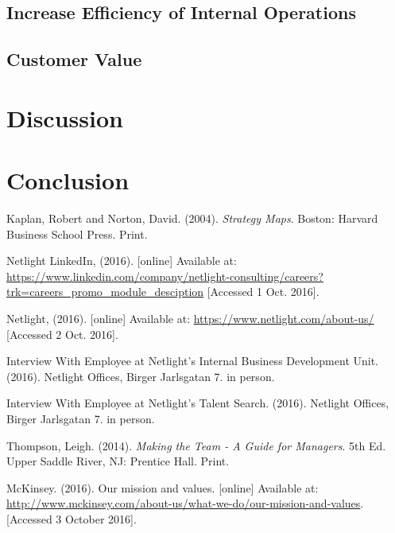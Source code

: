 \documentclass[12pt]{article}
\begin{document}
\subsection*{Increase Efficiency of Internal Operations}


\subsection*{Customer Value}
\hspace*{5pt}

\newpage
\section*{Discussion}

\section*{Conclusion}

\newpage

\makeatletter
\renewcommand\@biblabel[1]{}
\makeatother
\begin{thebibliography}{9}

 Kaplan, Robert and Norton, David. (2004). \textit{Strategy Maps}. Boston: Harvard Business School Press. Print.

 Netlight LinkedIn, (2016). [online] Available at: \url{https://www.linkedin.com/company/netlight-consulting/careers?trk=careers_promo_module_desciption} [Accessed 1 Oct. 2016].

 Netlight, (2016). [online] Available at: \url{https://www.netlight.com/about-us/} [Accessed 2 Oct. 2016].

 Interview With Employee at Netlight's Internal Business Development Unit. (2016). Netlight Offices, Birger Jarlsgatan 7. in person.

 Interview With Employee at Netlight's Talent Search. (2016). Netlight Offices, Birger Jarlsgatan 7. in person.

 Thompson, Leigh. (2014). \textit{Making the Team - A Guide for Managers}. 5th Ed. Upper Saddle River, NJ: Prentice Hall. Print.

 McKinsey. (2016). Our mission and values. [online] Available at: \url{http://www.mckinsey.com/about-us/what-we-do/our-mission-and-values}. [Accessed 3 October 2016].

\end{thebibliography}
\end{document}
